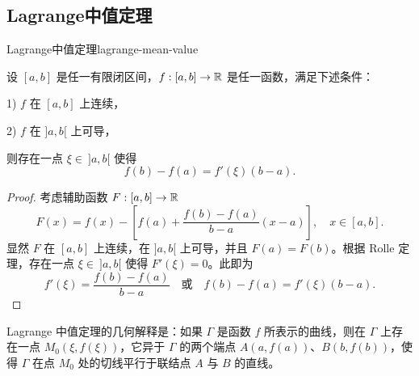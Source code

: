 \subsection{Lagrange中值定理}
	\label{sec:6-3-2}

\begin{mythm}{Lagrange中值定理}{lagrange-mean-value}

	设 \([a,b]\) 是任一有限闭区间，\(f:[a,b]\to\mathbb{R}\) 是任一函数，满足下述条件：

	1) \(f\) 在 \([a,b]\) 上连续，

	2) \(f\) 在 \(]a,b[\) 上可导，

	则存在一点 \(\xi\in\ ]a,b[\) 使得
	\[
	f(b)-f(a)=f'(\xi)(b-a).
	\]

\end{mythm}

\begin{proof}

	考虑辅助函数 \(F:[a,b]\to\mathbb{R}\)
	\[
	F(x)=f(x)-\left[f(a)+\frac{f(b)-f(a)}{b-a}(x-a)\right],\quad x\in[a,b].
	\]
	显然 \(F\) 在 \([a,b]\) 上连续，在 \(]a,b[\) 上可导，并且 \(F(a)=F(b)\)。根据 Rolle 定理，存在一点 \(\xi\in\ ]a,b[\) 使得 \(F'(\xi)=0\)。此即为
	\[
	f'(\xi)=\frac{f(b)-f(a)}{b-a}\quad\text{或}\quad f(b)-f(a)=f'(\xi)(b-a).
	\]

\end{proof}

Lagrange 中值定理的几何解释是：如果 \(\Gamma\) 是函数 \(f\) 所表示的曲线，则在 \(\Gamma\) 上存在一点 \(M_0(\xi,f(\xi))\)，它异于 \(\Gamma\) 的两个端点 \(A(a,f(a))\)、\(B(b,f(b))\)，使得 \(\Gamma\) 在点 \(M_0\) 处的切线平行于联结点 \(A\) 与 \(B\) 的直线。

